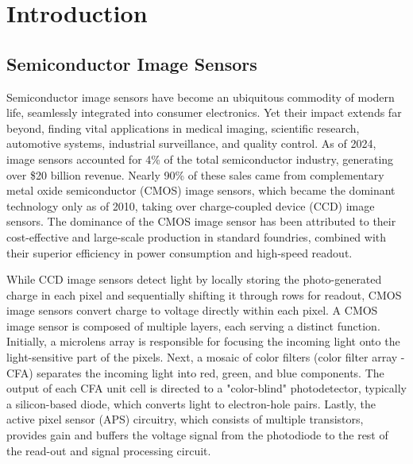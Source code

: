 \chapter{Introduction}\label{ch:introduction}

\section{Semiconductor Image Sensors}

Semiconductor image sensors have become an ubiquitous commodity of modern life, seamlessly integrated into consumer electronics. Yet their impact extends far beyond, finding vital applications in medical imaging, scientific research, automotive systems, industrial surveillance, and quality control. As of 2024, image sensors accounted for 4\% of the total semiconductor industry, generating over \$20 billion revenue. Nearly 90\% of these sales came from complementary metal oxide semiconductor (CMOS) image sensors, which became the dominant technology only as of 2010, taking over charge-coupled device (CCD) image sensors. The dominance of the CMOS image sensor has been attributed to their cost-effective and large-scale production in standard foundries, combined with their superior efficiency in power consumption and high-speed readout.


While CCD image sensors detect light by locally storing the photo-generated charge in each pixel and sequentially shifting it through rows for readout, CMOS image sensors convert charge to voltage directly within each pixel. A CMOS image sensor is composed of multiple layers, each serving a distinct function. Initially, a microlens array is responsible for focusing the incoming light onto the light-sensitive part of the pixels. Next, a mosaic of color filters (color filter array - CFA) separates the incoming light into red, green, and blue components. The output of each CFA unit cell is directed to a "color-blind" photodetector, typically a silicon-based diode, which converts light to electron-hole pairs. Lastly, the active pixel sensor (APS) circuitry, which consists of multiple transistors, provides gain and buffers the voltage signal from the photodiode to the rest of the read-out and signal processing circuit. 

